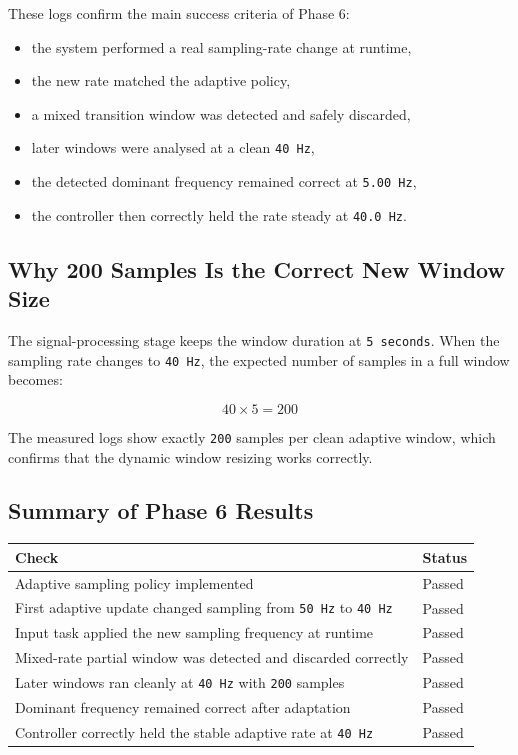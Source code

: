 \documentclass[12pt,a4paper]{article}
\begin{document}
These logs confirm the main success criteria of Phase 6:

\begin{itemize}
    \item the system performed a real sampling-rate change at runtime,
    \item the new rate matched the adaptive policy,
    \item a mixed transition window was detected and safely discarded,
    \item later windows were analysed at a clean \texttt{40 Hz},
    \item the detected dominant frequency remained correct at \texttt{5.00 Hz},
    \item the controller then correctly held the rate steady at
    \texttt{40.0 Hz}.
\end{itemize}

\subsection{Why 200 Samples Is the Correct New Window Size}

The signal-processing stage keeps the window duration at \texttt{5 seconds}.
When the sampling rate changes to \texttt{40 Hz}, the expected number of
samples in a full window becomes:

\[
40 \times 5 = 200
\]

The measured logs show exactly \texttt{200} samples per clean adaptive window,
which confirms that the dynamic window resizing works correctly.

\subsection{Summary of Phase 6 Results}

\begin{longtable}{|>{\raggedright\arraybackslash}p{}|>{\raggedright\arraybackslash}p{}|}
\hline
\textbf{Check} & \textbf{Status} \\
\hline
Adaptive sampling policy implemented & Passed \\
\hline
First adaptive update changed sampling from \texttt{50 Hz} to \texttt{40 Hz} & Passed \\
\hline
Input task applied the new sampling frequency at runtime & Passed \\
\hline
Mixed-rate partial window was detected and discarded correctly & Passed \\
\hline
Later windows ran cleanly at \texttt{40 Hz} with \texttt{200} samples & Passed \\
\hline
Dominant frequency remained correct after adaptation & Passed \\
\hline
Controller correctly held the stable adaptive rate at \texttt{40 Hz} & Passed \\
\hline
\end{longtable}
\end{document}
